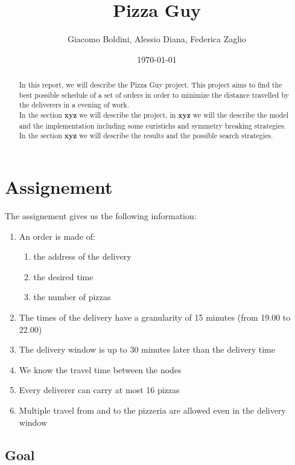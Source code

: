 \documentclass[10pt]{article}
\title{Pizza Guy}
\date{\today}
\author{Giacomo Boldini, Alessio Diana, Federica Zaglio}
\begin{document}
	\maketitle

	\begin{abstract}

		In this report, we will describe the Pizza Guy project. This project 
		aims to find the best possible schedule of a set of orders in order to
		minimize the distance travelled by the deliverers in a evening of 
		work.\\	In the section \textbf{xyz} we will describe the project, in 
		\textbf{xyz} we will the describe the model and the implementation 
		including some euristichs and symmetry breaking	strategies. In the
		section \textbf{xyz} we will describe the results and the possible 
		search strategies.
		
	\end{abstract}

	\tableofcontents

	\section{Assignement}
	
	The assignement gives us the following information:
	\begin{enumerate}
		\item An order is made of:
		\begin{enumerate}
			\item the address of the delivery
			\item the desired time
			\item the number of pizzas
		\end{enumerate}
		\item The times of the delivery have a granularity of 15 minutes (from 
			19.00 to 22.00)
		\item The delivery window is up to 30 minutes later than the delivery 
			time
		\item We know the travel time between the nodes
		\item Every deliverer can carry at most 16 pizzas
		\item Multiple travel from and to the pizzeria are allowed even in the 
			delivery window
	\end{enumerate}

	\subsection{Goal}
\end{document}
